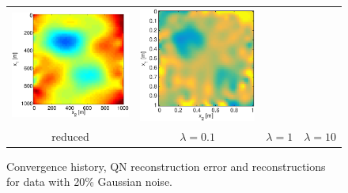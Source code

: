 \documentclass{iopart}
\begin{document}
\begin{figure}
\begin{tabular}{cccc}
\includegraphics[scale=.2]{./figs/2D_exp4_g}&
\includegraphics[scale=.2]{./figs/2D_exp4_h}\\
{\small reduced}&{\small $\lambda=0.1$}&{\small $\lambda=1$}&{\small $\lambda=10$}\\
\end{tabular}
\caption{Convergence history, QN reconstruction error and reconstructions for data with 20\% Gaussian noise.}
\label{fig:2D_exp4}
\end{figure}

\clearpage


\end{document}
